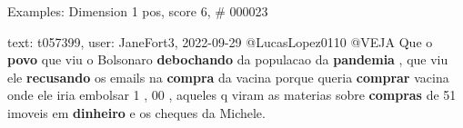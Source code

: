 \begin{frame}{Examples: Dimension 1 pos, score 6, \# 000023}
\footnotesize
\begin{exampleblock}{text: t057399, user: JaneFort3, 2022-09-29}
@LucasLopez0110 @VEJA Que o \textbf{povo} que viu o Bolsonaro 
\textbf{debochando} da populacao da \textbf{pandemia} , que viu ele 
\textbf{recusando} os emails na \textbf{compra} da vacina porque queria 
\textbf{comprar} vacina onde ele iria embolsar 1 , 00 , aqueles q viram as 
materias sobre \textbf{compras} de 51 imoveis em \textbf{dinheiro} e os cheques 
da Michele. 
\end{exampleblock}
\end{frame}
